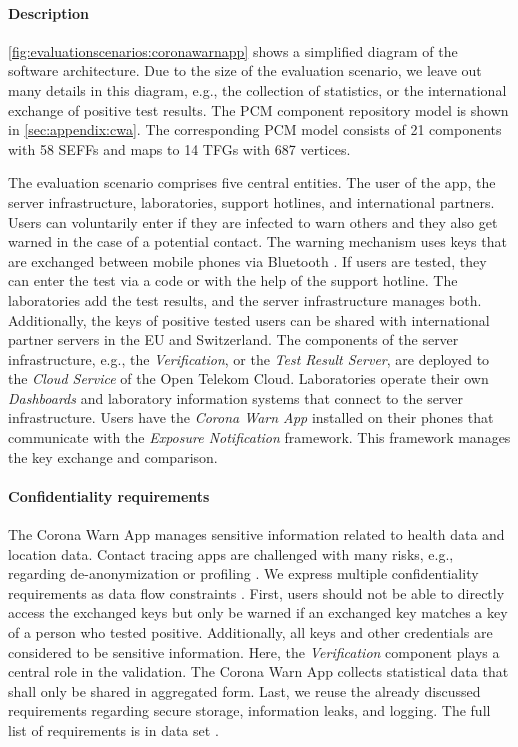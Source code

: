 \paragraph{Description}
\autoref{fig:evaluationscenarios:coronawarnapp} shows a simplified diagram of the software architecture.
Due to the size of the evaluation scenario, we leave out many details in this diagram, e.g., the collection of statistics, or the international exchange of positive test results.
The \ac{PCM} component repository model is shown in \autoref{sec:appendix:cwa}.
The corresponding \ac{PCM} model consists of 21 components with 58 \acp{SEFF} and maps to 14 \acp{TFG} with 687 vertices.

The evaluation scenario comprises five central entities.
The user of the app, the server infrastructure, laboratories, support hotlines, and international partners.
Users can voluntarily enter if they are infected to warn others and they also get warned in the case of a potential contact.
The warning mechanism uses keys that are exchanged between mobile phones via Bluetooth \cite{sap_corona-warn-app_2023}.
If users are tested, they can enter the test via a code or with the help of the support hotline.
The laboratories add the test results, and the server infrastructure manages both.
Additionally, the keys of positive tested users can be shared with international partner servers in the EU and Switzerland.
The components of the server infrastructure, e.g., the \emph{Verification}, or the \emph{Test Result Server}, are deployed to the \emph{Cloud Service} of the Open Telekom Cloud.
Laboratories operate their own \emph{Dashboards} and laboratory information systems that connect to the server infrastructure.
Users have the \emph{Corona Warn App} installed on their phones that communicate with the \emph{Exposure Notification} framework.
This framework manages the key exchange and comparison.

\paragraph{Confidentiality requirements}
The Corona Warn App manages sensitive information related to health data and location data.
Contact tracing apps are challenged with many risks, e.g., regarding de-anonymization or profiling \cite{baumgartner_mind_2020}.
We express multiple confidentiality requirements as data flow constraints \cite{hahner_modeling_2021,boltz_extensible_2024}.
First, users should not be able to directly access the exchanged keys but only be warned if an exchanged key matches a key of a person who tested positive.
Additionally, all keys and other credentials are considered to be sensitive information.
Here, the \emph{Verification} component plays a central role in the validation.
The Corona Warn App collects statistical data that shall only be shared in aggregated form.
Last, we reuse the already discussed requirements regarding secure storage, information leaks, and logging.
The full list of requirements is in data set \cite{dataset}.

